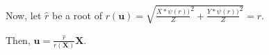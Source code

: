 Now, let \(\widehat{r}\) be a root of
\(r(\mathbf{u})
= \sqrt{
	\frac{X * \psi \left( r\right))}{Z}^{2} +
	\frac{Y * \psi \left( r\right))}{Z}^{2}
} = r\).

Then, \(\mathbf{u} = \frac{\widehat{r}}{r(\mathbf{X})}\mathbf{X}\).




